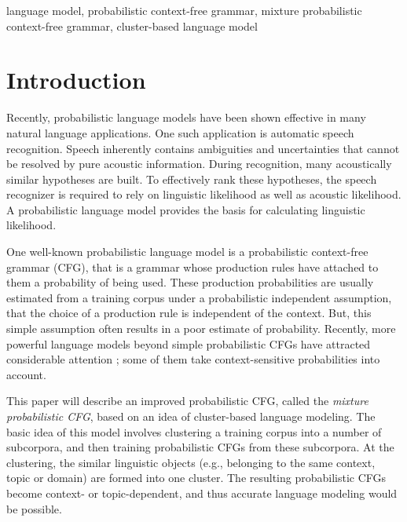 \ekeywords
{
language model, probabilistic context-free grammar,
mixture probabilistic context-free grammar,
cluster-based language model
}




\maketitle

\section{Introduction}

Recently, probabilistic language models have been shown effective
in many natural language applications.
One such application is automatic speech recognition.
Speech inherently contains ambiguities and uncertainties
that cannot be resolved by pure acoustic information.
During recognition, many acoustically similar hypotheses are built.
To effectively rank these hypotheses,
the speech recognizer is required to rely on
linguistic likelihood as well as acoustic likelihood.
A probabilistic language model provides the basis for
calculating linguistic likelihood.

One well-known probabilistic language model is
a probabilistic context-free grammar (CFG),\hspace*{-1mm}
that is a grammar whose production rules have attached to them
a probability of being used.
These production probabilities are usually estimated
from a training corpus
under a probabilistic independent assumption,
that the choice of a production rule is independent
of the context.
But, this simple assumption often results in
a poor estimate of probability.
Recently, more powerful language models
beyond simple probabilistic CFGs
have attracted considerable attention \cite{Chitrao90,Magerman91,Black92,Chiang95};
some of them take
context-sensitive probabilities into account.

This paper will describe an improved probabilistic CFG,
called the {\em mixture probabilistic CFG},
based on an idea of cluster-based language modeling.
The basic idea of this model involves
clustering a training corpus into a number of subcorpora,
and then training probabilistic CFGs from these subcorpora.
At the clustering, the similar linguistic objects
(e.g., belonging to the same context, topic or domain)
are formed into one cluster.
The resulting probabilistic CFGs become
context- or topic-dependent,
and thus accurate language modeling would be possible.

